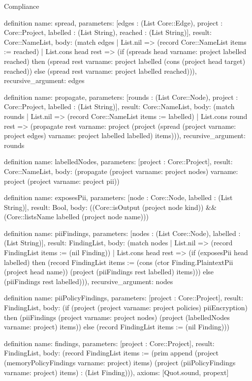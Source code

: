 \begin{lexlean}{Compliance}
\begin{semanticmodule}
definition{
  name: spread,
  parameters: [edges : (List Core::Edge), project : Core::Project, labelled : (List String), reached : (List String)],
  result: Core::NameList,
  body: (match edges
    | List.nil => (record Core::NameList {items := reached})
    | List.cons head rest => (if (spreads head var{name: project} labelled reached) then (spread rest var{name: project} labelled (cons (project head target) reached)) else (spread rest var{name: project} labelled reached))),
  recursive_argument: edges
}

definition{
  name: propagate,
  parameters: [rounds : (List Core::Node), project : Core::Project, labelled : (List String)],
  result: Core::NameList,
  body: (match rounds
    | List.nil => (record Core::NameList {items := labelled})
    | List.cons round rest => (propagate rest var{name: project} (project (spread (project var{name: project} edges) var{name: project} labelled labelled) items))),
  recursive_argument: rounds
}

definition{
  name: labelledNodes,
  parameters: [project : Core::Project],
  result: Core::NameList,
  body: (propagate (project var{name: project} nodes) var{name: project} (project var{name: project} pii))
}

definition{
  name: exposesPii,
  parameters: [node : Core::Node, labelled : (List String)],
  result: Bool,
  body: ((Core::isOutput (project node kind)) && (Core::listsName labelled (project node name)))
}

definition{
  name: piiFindings,
  parameters: [nodes : (List Core::Node), labelled : (List String)],
  result: FindingList,
  body: (match nodes
    | List.nil => (record FindingList {items := (nil Finding)})
    | List.cons head rest => (if (exposesPii head labelled) then (record FindingList {items := (cons (ctor Finding.PlaintextPii (project head name)) (project (piiFindings rest labelled) items))}) else (piiFindings rest labelled))),
  recursive_argument: nodes
}

definition{
  name: piiPolicyFindings,
  parameters: [project : Core::Project],
  result: FindingList,
  body: (if (project (project var{name: project} policies) piiEncryption) then (piiFindings (project var{name: project} nodes) (project (labelledNodes var{name: project}) items)) else (record FindingList {items := (nil Finding)}))
}

definition{
  name: findings,
  parameters: [project : Core::Project],
  result: FindingList,
  body: (record FindingList {items := (prim append (project (memoryPolicyFindings var{name: project}) items) (project (piiPolicyFindings var{name: project}) items) : (List Finding))}),
  axioms: [Quot.sound, propext]
}


\end{semanticmodule}
\end{lexlean}
